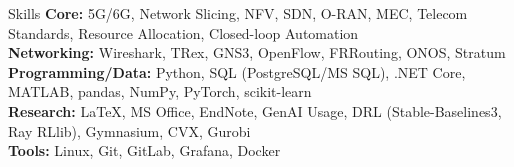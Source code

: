 \documentclass{resume}
\begin{document}
\begin{rSection}{Skills}\itemsep -5pt
\textbf{Core:} 5G/6G, Network Slicing, NFV, SDN, O-RAN, MEC, Telecom Standards, Resource Allocation, Closed-loop Automation\\
\textbf{Networking:} Wireshark, TRex, GNS3, OpenFlow, FRRouting, ONOS, Stratum\\
\textbf{Programming/Data:} Python, SQL (PostgreSQL/MS SQL), .NET Core, MATLAB, pandas, NumPy, PyTorch, scikit-learn\\
\textbf{Research:} \LaTeX, MS Office, EndNote, GenAI Usage, DRL (Stable-Baselines3, Ray RLlib), Gymnasium, CVX, Gurobi\\
\textbf{Tools:} Linux, Git, GitLab, Grafana, Docker
\end{rSection}
\end{document}
